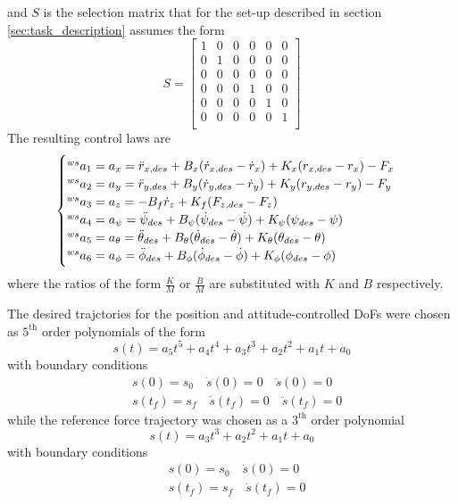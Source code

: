 and $S$ is the selection matrix that for the set-up described in section \ref{sec:task_description} assumes the form
\[
S =
\begin {bmatrix}
  1 & 0 & 0 & 0 & 0 & 0\\
  0 & 1 & 0 & 0 & 0 & 0\\
  0 & 0 & 0 & 0 & 0 & 0\\
  0 & 0 & 0 & 1 & 0 & 0\\
  0 & 0 & 0 & 0 & 1 & 0\\
  0 & 0 & 0 & 0 & 0 & 1\\
\end {bmatrix}
\]
The resulting control laws are
\begin{equation}\label{eq:final_a_cmd}
\begin{cases}
\prescript{ws}{}{a}_1 = a_x = \ddot{r}_{x,des} + B_x (\dot{r}_{x,des} - \dot{r}_x) + K_x (r_{x,des} - r_x) - F_x \\
\prescript{ws}{}{a}_2 = a_y = \ddot{r}_{y,des} + B_y (\dot{r}_{y,des} - \dot{r}_y) + K_y (r_{y,des} - r_y) - F_y \\
\prescript{ws}{}{a}_3 = a_z = - B_f \dot{r}_z + K_f(F_{z,des} - F_z) \\
\prescript{ws}{}{a}_4 = a_{\psi} = \ddot{\psi}_{des} + B_{\psi} (\dot{\psi}_{des} - \dot{\psi}) + K_{\psi} (\psi_{des} - \psi) \\
\prescript{ws}{}{a}_5 = a_{\theta} = \ddot{\theta}_{des} + B_{\theta} (\dot{\theta}_{des} - \dot{\theta}) + K_{\theta} (\theta_{des} - \theta) \\
\prescript{ws}{}{a}_6 = a_{\phi} = \ddot{\phi}_{des} + B_{\phi} (\dot{\phi}_{des} - \dot{\phi}) + K_{\phi} (\phi_{des} - \phi)
\end{cases}
\end{equation}
where the ratios of the form $\frac{K}{M}$ or $\frac{B}{M}$ are substituted with $K$ and $B$ respectively.
\par
The desired trajctories for the position and attitude-controlled DoFs were chosen as  $5^\text{th}$ order polynomials of the form
\[
s(t) = a_5 t^5 + a_4 t^4 + a_3 t^3 + a_2 t^2 +a_1 t + a_0
\]
with boundary conditions
\[
\begin{split}
  &s(0) = s_0 \quad \dot{s}(0) = 0 \quad \ddot{s}(0) = 0\\
  &s(t_f) = s_f \quad \dot{s}(t_f) = 0 \quad \ddot{s}(t_f) = 0
\end{split}
\]
while the reference force trajectory was chosen as a $3^\text{th}$ order polynomial
\[
s(t) = a_3 t^3 + a_2 t^2 +a_1 t + a_0
\] 
with boundary conditions
\[
\begin{split}
  &s(0) = s_0 \quad \dot{s}(0) = 0\\
  &s(t_f) = s_f \quad \dot{s}(t_f) = 0
\end{split}
\]
\newpage
